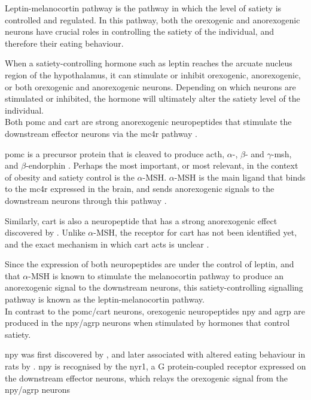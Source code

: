 Leptin-melanocortin pathway is the pathway in which the level of satiety is controlled and regulated.
In this pathway, both the orexogenic and anorexogenic neurons have crucial roles in controlling the satiety of the individual, and therefore their eating behaviour.

When a satiety-controlling hormone such as leptin reaches the arcuate nucleus region of the hypothalamus, it can stimulate or inhibit orexogenic, anorexogenic, or both orexogenic and anorexogenic neurons.
Depending on which neurons are stimulated or inhibited, the hormone will ultimately alter the satiety level of the individual.\\

\noindent
Both \gls{pomc} and \gls{cart} are strong anorexogenic neuropeptides that stimulate the downstream effector neurons via the \gls{mc4r} pathway \citep{Barsh2002}.

\gls{pomc} is a precursor protein that is cleaved to produce \gls{acth}, $\alpha$-, $\beta$- and $\gamma$-\gls{msh}, and $\beta$-endorphin \citep{Smith1988}.
Perhaps the most important, or most relevant, in the context of obesity and satiety control is the $\alpha$-MSH.
$\alpha$-MSH is the main ligand that binds to the \gls{mc4r} expressed in the brain, and sends anorexogenic signals to the downstream neurons through this pathway \citep{Krude1998}.

Similarly, \gls{cart} is also a neuropeptide that has a strong anorexogenic effect discovered by \citet{Kristensen1998}.
Unlike $\alpha$-MSH, the receptor for \gls{cart} has not been identified yet, and the exact mechanism in which \gls{cart} acts is unclear \citep{Kristensen1998, Rogge2008}.

Since the expression of both neuropeptides are under the control of leptin, and that $\alpha$-MSH is known to stimulate the melanocortin pathway to produce an anorexogenic signal to the downstream neurons, this satiety-controlling signalling pathway is known as the leptin-melanocortin pathway.
\\

\noindent
In contrast to the \gls{pomc}/\gls{cart} neurons, orexogenic neuropeptides \gls{npy} and \gls{agrp} are produced in the \gls{npy}/\gls{agrp} neurons when stimulated by hormones that control satiety.

\gls{npy} was first discovered by \citet{Tatemoto1982}, and later associated with altered eating behaviour in rats by \citet{Clark1984}.
\gls{npy} is recognised by the \gls{nyr1}, a G protein-coupled receptor expressed on the downstream effector neurons, which relays the orexogenic signal from the \gls{npy}/\gls{agrp} neurons \citep{Barsh2002, Bell2005, Herzog1992}


